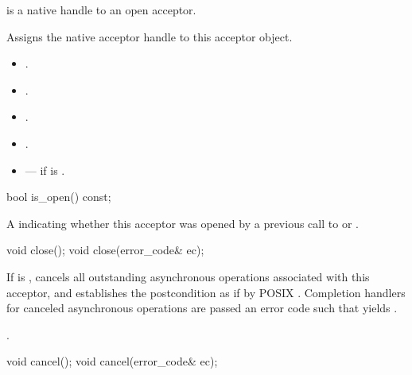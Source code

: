 \begin{itemdescr}
\pnum
\requires {} is a native handle to an open acceptor.

\pnum
\effects Assigns the native acceptor handle to this acceptor object.

\pnum
\postconditions 
\begin{itemize}
\item
{}.
\item
{}.
\item
{}.
\item
{}.
\end{itemize}

\pnum
\errors
\begin{itemize}
\item
{} --- if  is .
\end{itemize}
\end{itemdescr}

\begin{itemdecl}
bool is_open() const;
\end{itemdecl}

\begin{itemdescr}
\pnum
\returns A  indicating whether this acceptor was opened by a previous call to  or .
\end{itemdescr}

\begin{itemdecl}
void close();
void close(error_code& ec);
\end{itemdecl}

\begin{itemdescr}
\pnum
\effects If  is , cancels all outstanding asynchronous operations associated with this acceptor, and establishes the postcondition as if by POSIX . Completion handlers for canceled asynchronous operations are passed an error code  such that  yields .

\pnum
\postconditions {}.
\end{itemdescr}

\begin{itemdecl}
void cancel();
void cancel(error_code& ec);
\end{itemdecl}

